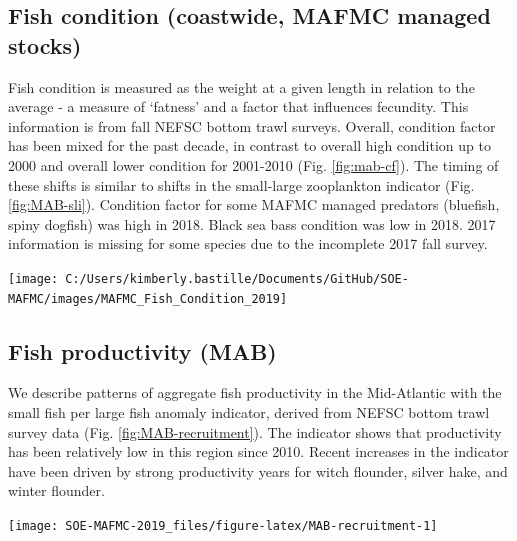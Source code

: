 \documentclass[10pt,]{article}
\let\origfigure\figure
\let\endorigfigure\endfigure
\renewenvironment{figure}[1][2] {
    \expandafter\origfigure\expandafter[H]
} {
    \endorigfigure
}
\begin{document}
\subsection{Fish condition (coastwide, MAFMC managed
stocks)}\label{fish-condition-coastwide-mafmc-managed-stocks}

Fish condition is measured as the weight at a given length in relation
to the average - a measure of `fatness' and a factor that influences
fecundity. This information is from fall NEFSC bottom trawl surveys.
Overall, condition factor has been mixed for the past decade, in
contrast to overall high condition up to 2000 and overall lower
condition for 2001-2010 (Fig. \ref{fig:mab-cf}). The timing of these
shifts is similar to shifts in the small-large zooplankton indicator
(Fig. \ref{fig:MAB-sli}). Condition factor for some MAFMC managed
predators (bluefish, spiny dogfish) was high in 2018. Black sea bass
condition was low in 2018. 2017 information is missing for some species
due to the incomplete 2017 fall survey.

\begin{figure}

{\centering \texttt{[image: C:/Users/kimberly.bastille/Documents/GitHub/SOE-MAFMC/images/MAFMC\_Fish\_Condition\_2019]} 

}

\caption{Condition factor for MAFMC managed species.}\label{fig:mab-cf}
\end{figure}

\subsection{Fish productivity (MAB)}\label{fish-productivity-mab}

We describe patterns of aggregate fish productivity in the Mid-Atlantic
with the small fish per large fish anomaly indicator, derived from NEFSC
bottom trawl survey data (Fig. \ref{fig:MAB-recruitment}). The indicator
shows that productivity has been relatively low in this region since
2010. Recent increases in the indicator have been driven by strong
productivity years for witch flounder, silver hake, and winter flounder.

\begin{figure}

{\centering \texttt{[image: SOE-MAFMC-2019\_files/figure-latex/MAB-recruitment-1]} 

}

\caption{Small fish per large fish biomass anomaly in the Mid-Atlantic Bight. The summed anomaly across species is shown by the black line.}\label{fig:MAB-recruitment}
\end{figure}
\end{document}
